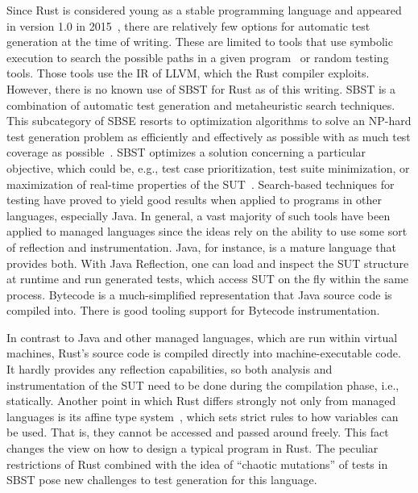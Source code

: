 \documentclass[paper=a4,%
  twoside,%
  BCOR4mm,%
  abstract=true,%
  toc=bibliography,%
  chapterprefix=true,%
  toc=bibliographynumbered,%
  open=right,%
  english,%
  pagesize=pdftex]{scrreprt}
\newcommand{\sut}{\ac{SUT}\xspace}
\begin{document}
Since Rust is considered young as a stable programming language and appeared in version 1.0 in 2015~\cite{Rust10}, there are relatively few options for automatic test generation at the time of writing. These are limited to tools that use symbolic execution to search the possible paths in a given program~\cite{cadar2008klee} or random testing tools. Those tools use the \ac{IR} of LLVM, which the Rust compiler exploits. However, there is no known use of \ac{SBST} for Rust as of this writing. \ac{SBST} is a combination of automatic test generation and metaheuristic search techniques. This subcategory of \ac{SBSE} resorts to optimization algorithms to solve an NP-hard test generation problem as efficiently and effectively as possible with as much test coverage as possible~\cite{Khari2019}. \ac{SBST} optimizes a solution concerning a particular objective, which could be, e.g., test case prioritization, test suite minimization, or maximization of real-time properties of the \sut~\cite{Khari2019}. Search-based techniques for testing have proved to yield good results when applied to programs in other languages, especially Java. In general, a vast majority of such tools have been applied to managed languages since the ideas rely on the ability to use some sort of reflection and instrumentation. Java, for instance, is a mature language that provides both. With Java Reflection, one can load and inspect the \sut structure at runtime and run generated tests, which access \sut on the fly within the same process. Bytecode is a much-simplified representation that Java source code is compiled into. There is good tooling support for Bytecode instrumentation.

In contrast to Java and other managed languages, which are run within virtual machines, Rust's source code is compiled directly into machine-executable code. It hardly provides any reflection capabilities, so both analysis and instrumentation of the \sut need to be done during the compilation phase, i.e., statically. Another point in which Rust differs strongly not only from managed languages is its affine type system~\cite{Anderson2016}, which sets strict rules to how variables can be used. That is, they cannot be accessed and passed around freely. This fact changes the view on how to design a typical program in Rust. The peculiar restrictions of Rust combined with the idea of ``chaotic mutations'' of tests in \ac{SBST} pose new challenges to test generation for this language.
\end{document}
